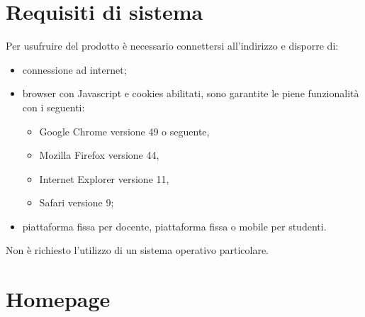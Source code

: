 \documentclass[a4paper, titlepage]{article}
\begin{document}
	\section{Requisiti di sistema}
	Per usufruire del prodotto è necessario connettersi all'indirizzo  e disporre di:
	\begin{itemize}
		\item connessione ad internet;
		\item browser con Javascript e cookies abilitati, sono garantite le piene funzionalità con i seguenti:
		\begin{itemize}
			\item Google Chrome versione 49 o seguente,
			\item Mozilla Firefox versione 44,
			\item Internet Explorer versione 11,
			\item Safari versione 9;
		\end{itemize}
		\item piattaforma fissa per docente, piattaforma fissa o mobile per studenti.
	\end{itemize}
	Non è richiesto l’utilizzo di un sistema operativo particolare.
	
	\newpage
	\section{Homepage}
	
\end{document}
